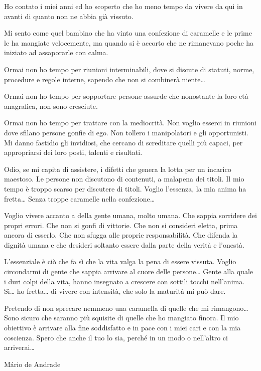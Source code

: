 \documentclass[12pt]{book} %
\begin{document}
\bigskip
\begin{mdframed}[linewidth=1pt]
Ho contato i miei anni ed ho scoperto che ho meno tempo da vivere da qui in avanti di quanto non ne abbia già vissuto.

Mi sento come quel bambino che ha vinto una confezione di caramelle e le prime le ha mangiate velocemente, ma quando si
è accorto che ne rimanevano poche ha iniziato ad assaporarle con calma.

Ormai non ho tempo per riunioni interminabili, dove si discute di statuti, norme, procedure e regole interne, sapendo
che non si combinerà niente…

Ormai non ho tempo per sopportare persone assurde che nonostante la loro età anagrafica, non sono cresciute.

Ormai non ho tempo per trattare con la mediocrità. Non voglio esserci in riunioni dove sfilano persone gonfie di ego.
Non tollero i manipolatori e gli opportunisti. Mi danno fastidio gli invidiosi, che cercano di screditare quelli più
capaci, per appropriarsi dei loro posti, talenti e risultati.

Odio, se mi capita di assistere, i difetti che genera la lotta per un incarico maestoso. Le persone non discutono di
contenuti, a malapena dei titoli. Il mio tempo è troppo scarso per discutere di titoli. Voglio
l'essenza, la mia anima ha fretta… Senza troppe caramelle nella confezione…

Voglio vivere accanto a della gente umana, molto umana. Che sappia sorridere dei propri errori. Che non si gonfi di
vittorie. Che non si consideri eletta, prima ancora di esserlo. Che non sfugga alle proprie responsabilità. Che difenda
la dignità umana e che desideri soltanto essere dalla parte della verità e l'onestà.

L'essenziale è ciò che fa sì che la vita valga la pena di essere vissuta. Voglio circondarmi di
gente che sappia arrivare al cuore delle persone… Gente alla quale i duri colpi della vita, hanno insegnato a crescere
con sottili tocchi nell'anima. Sì… ho fretta… di vivere con intensità, che solo la maturità mi può
dare.

Pretendo di non sprecare nemmeno una caramella di quelle che mi rimangono… Sono sicuro che saranno più squisite di
quelle che ho mangiato finora. Il mio obiettivo è arrivare alla fine soddisfatto e in pace con i miei cari e con la mia
coscienza. Spero che anche il tuo lo sia, perché in un modo o nell'altro ci arriverai…


\bigskip

Mário de Andrade
\end{mdframed}
\end{document}
